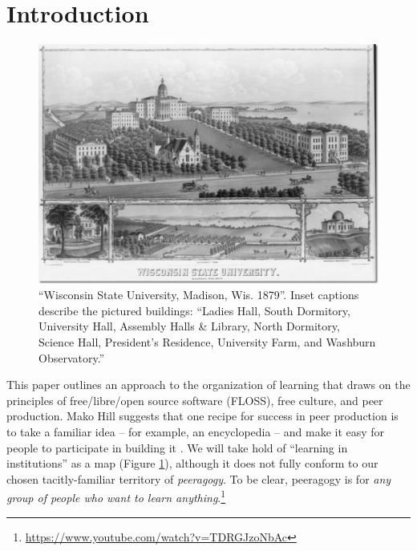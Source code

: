 
\section*{Introduction}\label{sec:Introduction}

\begin{figure}
\vspace{-1.15cm}
\begin{center}
\includegraphics[width=.5\textwidth,trim=0 30 10 2, clip=true]{wisconsin-map}
\end{center}
\vspace{-.5cm}
\caption{``Wisconsin State
  University, Madison, Wis. 1879''.  Inset captions describe
  the pictured buildings: ``Ladies Hall, South Dormitory, University
  Hall, Assembly Halls \& Library, North Dormitory, Science Hall,
  President's Residence, University Farm, and Washburn Observatory.''
\label{madison-map}}
\vspace{-.9cm}
\end{figure}

This paper  outlines an approach to the organization of learning that draws on the principles of free\slash libre\slash open source software (FLOSS), free culture, and peer production.
Mako Hill suggests that one recipe for success in peer production is to take a familiar idea -- for example, an encyclopedia -- and make it easy for people to participate in building it \cite[Chapter 1]{mako-thesis}.  We will take hold of ``learning in institutions'' as a map (Figure \ref{madison-map}), although it does not fully conform to our chosen tacitly-familiar territory of \emph{peeragogy}.  To be clear, peeragogy is for \emph{any group of people who want to learn anything}.\footnote{\url{https://www.youtube.com/watch?v=TDRGJzoNbAc}}

